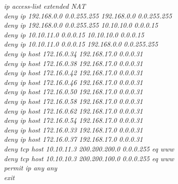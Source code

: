 \documentclass[a4paper, 12pt]{article}
\begin{document}
\hspace*{2cm}\textit{ip access-list extended NAT\\
\hspace*{2cm}deny ip 192.168.0.0 0.0.255.255 192.168.0.0 0.0.255.255\\
\hspace*{2cm}deny ip 192.168.0.0 0.0.255.255 10.10.10.0 0.0.0.15\\
\hspace*{2cm}deny ip 10.10.11.0 0.0.0.15 10.10.10.0 0.0.0.15\\
\hspace*{2cm}deny ip 10.10.11.0 0.0.0.15 192.168.0.0 0.0.255.255\\
\hspace*{2cm}deny ip host 172.16.0.34 192.168.17.0 0.0.0.31\\
\hspace*{2cm}deny ip host 172.16.0.38 192.168.17.0 0.0.0.31\\
\hspace*{2cm}deny ip host 172.16.0.42 192.168.17.0 0.0.0.31\\
\hspace*{2cm}deny ip host 172.16.0.46 192.168.17.0 0.0.0.31\\
\hspace*{2cm}deny ip host 172.16.0.50 192.168.17.0 0.0.0.31\\
\hspace*{2cm}deny ip host 172.16.0.58 192.168.17.0 0.0.0.31\\
\hspace*{2cm}deny ip host 172.16.0.62 192.168.17.0 0.0.0.31\\
\hspace*{2cm}deny ip host 172.16.0.54 192.168.17.0 0.0.0.31\\
\hspace*{2cm}deny ip host 172.16.0.33 192.168.17.0 0.0.0.31\\
\hspace*{2cm}deny ip host 172.16.0.37 192.168.17.0 0.0.0.31\\
\hspace*{2cm}deny tcp host 10.10.11.3 200.200.200.0 0.0.0.255 eq www\\
\hspace*{2cm}deny tcp host 10.10.10.3 200.200.100.0 0.0.0.255 eq www\\
\hspace*{2cm}permit ip any any\\
\hspace*{2cm}exit\\
}
\end{document}
